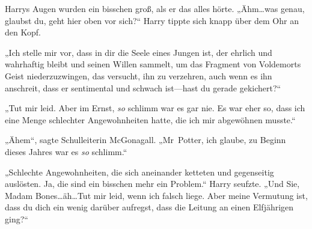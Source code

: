 Harrys Augen wurden ein bisschen groß, als er das alles hörte.
„Ähm…was genau, glaubst du, geht hier oben vor sich?“
Harry tippte sich knapp über dem Ohr an den Kopf.

„Ich stelle mir vor, dass in dir die Seele eines Jungen ist, der ehrlich und wahrhaftig bleibt und seinen Willen sammelt, um das Fragment von Voldemorts Geist niederzuzwingen, das versucht, ihn zu verzehren, auch wenn es ihn anschreit, dass er sentimental und schwach ist—hast du gerade gekichert?“

„Tut mir leid. Aber im Ernst, \emph{so} schlimm war es gar nie. Es war eher so, dass ich eine Menge schlechter Angewohnheiten hatte, die ich mir abgewöhnen musste.“

„Ähem“, sagte Schulleiterin McGonagall. „Mr~Potter, ich glaube, zu Beginn dieses Jahres war es \emph{so} schlimm.“

„Schlechte Angewohnheiten, die sich aneinander ketteten und gegenseitig auslösten. Ja, die sind ein bisschen mehr ein Problem.“
Harry seufzte.
„Und Sie, Madam Bones…äh…Tut mir leid, wenn ich falsch liege. Aber meine Vermutung ist, dass du dich ein wenig darüber aufregst, dass die Leitung an einen Elfjährigen ging?“

